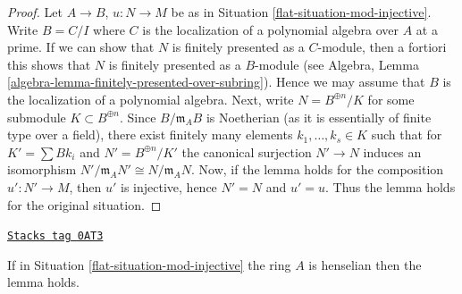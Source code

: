 \begin{proof}

Let $A \to B$, $u : N \to M$ be as in Situation \ref{flat-situation-mod-injective}.
Write $B = C/I$ where $C$ is the localization of a polynomial algebra
over $A$ at a prime. If we can show that $N$ is finitely presented as
a $C$-module, then a fortiori this shows that $N$ is finitely presented
as a $B$-module (see
Algebra, Lemma \ref{algebra-lemma-finitely-presented-over-subring}).
Hence we may assume that $B$ is the localization of a polynomial algebra.
Next, write $N = B^{\oplus n}/K$ for some submodule $K \subset B^{\oplus n}$.
Since $B/\mathfrak m_AB$ is Noetherian (as it is essentially of finite type
over a field), there exist finitely many elements $k_1, \ldots, k_s \in K$
such that for $K' = \sum Bk_i$ and $N' = B^{\oplus n}/K'$ the
canonical surjection $N' \to N$ induces an isomorphism
$N'/\mathfrak m_AN' \cong N/\mathfrak m_AN$.
Now, if the lemma holds for the composition $u' : N' \to M$,
then $u'$ is injective, hence $N' = N$ and $u' = u$. Thus the lemma holds for
the original situation.
\end{proof}

\begin{lemma}
\label{flat-lemma-henselian-finite-type-injective-into-flat-mod-m}
\href{https://stacks.math.columbia.edu/tag/0AT3}{\texttt{Stacks tag 0AT3}}

If in Situation \ref{flat-situation-mod-injective} the ring $A$ is henselian
then the lemma holds.
\end{lemma}

